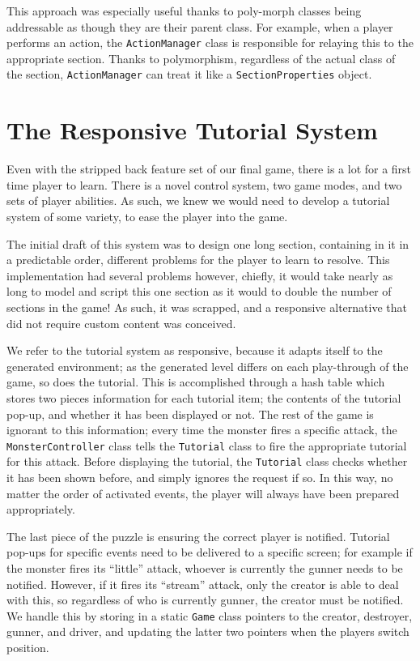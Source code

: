 \documentclass[a4paper,oneside]{memoir}
\begin{document}
			This approach was especially useful thanks to poly-morph classes being addressable as though they are their parent class.
			For example, when a player performs an action, the \texttt{ActionManager} class is responsible for relaying this to the appropriate section.
			Thanks to polymorphism, regardless of the actual class of the section, \texttt{ActionManager} can treat it like a \texttt{SectionProperties} object.

		\section{The Responsive Tutorial System}

			Even with the stripped back feature set of our final game, there is a lot for a first time player to learn.
			There is a novel control system, two game modes, and two sets of player abilities.
			As such, we knew we would need to develop a tutorial system of some variety, to ease the player into the game.

			The initial draft of this system was to design one long section, containing in it in a predictable order, different problems for the player to learn to resolve.
			This implementation had several problems however, chiefly, it would take nearly as long to model and script this one section as it would to double the number of sections in the game!
			As such, it was scrapped, and a responsive alternative that did not require custom content was conceived. 

			We refer to the tutorial system as responsive, because it adapts itself to the generated environment; as the generated level differs on each play-through of the game, so does the tutorial.
			This is accomplished through a hash table which stores two pieces information for each tutorial item; the contents of the tutorial pop-up, and whether it has been displayed or not.
			The rest of the game is ignorant to this information; every time the monster fires a specific attack, the \texttt{MonsterController} class tells the \texttt{Tutorial} class to fire the appropriate tutorial for this attack.
			Before displaying the tutorial, the \texttt{Tutorial} class checks whether it has been shown before, and simply ignores the request if so.
			In this way, no matter the order of activated events, the player will always have been prepared appropriately.

			The last piece of the puzzle is ensuring the correct player is notified. 
			Tutorial pop-ups for specific events need to be delivered to a specific screen; for example if the monster fires its ``little'' attack, whoever is currently the gunner needs to be notified.
			However, if it fires its ``stream'' attack, only the creator is able to deal with this, so regardless of who is currently gunner, the creator must be notified.
			We handle this by storing in a static \texttt{Game} class pointers to the creator, destroyer, gunner, and driver, and updating the latter two pointers when the players switch position.
\end{document}
